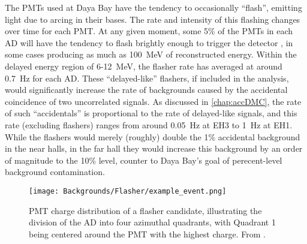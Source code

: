 \documentclass[../thesis.tex]{subfiles}
\begin{document}
The PMTs used at Daya Bay have the tendency to occasionally ``flash'', emitting light due to arcing in their bases. The rate and intensity of this flashing changes over time for each PMT. At any given moment, some 5\% of the PMTs in each AD will have the tendency to flash brightly enough to trigger the detector \cite{SideBySide}, in some cases producing as much as 100~MeV of reconstructed energy. Within the delayed energy region of 6-12~MeV, the flasher rate has averaged at around 0.7~Hz for each AD. These ``delayed-like'' flashers, if included in the analysis, would significantly increase the rate of backgrounds caused by the accidental coincidence of two uncorrelated signals. As discussed in \autoref{chap:accDMC}, the rate of such ``accidentals'' is proportional to the rate of delayed-like signals, and this rate (excluding flashers) ranges from around 0.05~Hz at EH3 to 1~Hz at EH1. While the flashers would merely (roughly) double the 1\% accidental background in the near halls, in the far hall they would increase this background by an order of magnitude to the 10\% level, counter to Daya Bay's goal of perecent-level background contamination.

\begin{figure}[h!]
  \texttt{[image: Backgrounds/Flasher/example\_event.png]}
  \caption{PMT charge distribution of a flasher candidate, illustrating the division of the AD into four azimuthal quadrants, with Quadrant 1 being centered around the PMT with the highest charge. From \cite{An_2017}.}
  \label{fig:flasher_exampleOverview}
\end{figure}
\end{document}
